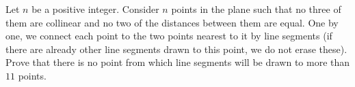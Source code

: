 Let $n$ be a positive integer. Consider $n$ points in the plane such that no three of them are collinear and no two of the distances between them are equal. One by one, we connect each point to the two points nearest to it by line segments (if there are already other line segments drawn to this point, we do not erase these). Prove that there is no point from which line segments will be drawn to more than $11$ points.